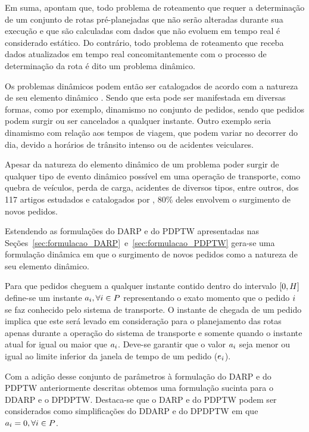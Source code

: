 Em suma, \textcite{psaraftis_dynamic_2015} apontam que, 
todo problema de roteamento que requer a determinação de um conjunto
de rotas pré-planejadas que não serão alteradas durante sua execução e que 
são calculadas com dados que não evoluem em tempo real é considerado estático.
Do contrário, todo problema de roteamento que receba dados atualizados em tempo
real concomitantemente com o processo de determinação da rota é dito um
problema dinâmico. 

Os problemas dinâmicos podem então ser catalogados de acordo com a natureza de
seu elemento dinâmico \cite{psaraftis_dynamic_2015}.
Sendo que esta pode ser manifestada em diversas formas, como por exemplo,
dinamismo no conjunto de pedidos, sendo que pedidos podem surgir ou ser
cancelados a qualquer instante.
Outro exemplo seria dinamismo com relação aos tempos de viagem, que podem
variar no decorrer do dia, devido a horários de trânsito intenso ou de
acidentes veiculares.

Apesar da natureza do elemento dinâmico de um problema poder surgir de qualquer
tipo de evento dinâmico possível em uma operação de transporte, como quebra de
veículos, perda de carga, acidentes de diversos tipos, entre outros, dos 117
artigos estudados e catalogados por  \textcite{psaraftis_dynamic_2015}, 80\%
deles envolvem o surgimento de novos pedidos.

Estendendo as formulações do DARP e do PDPTW apresentadas nas
Seções~\ref{sec:formulacao_DARP}~e~\ref{sec:formulacao_PDPTW} gera-se uma
formulação dinâmica em que o surgimento de novos pedidos como a natureza de 
seu elemento dinâmico.

Para que pedidos cheguem a qualquer instante contido dentro
do intervalo $[0, H]$ define-se um instante 
$a_i, \forall i \in P$ representando 
o exato momento que o pedido $i$ se faz conhecido pelo sistema de 
transporte.
O instante de chegada de um pedido implica que este será levado
em consideração para o planejamento das rotas apenas durante a
operação do sistema de transporte e somente quando o instante atual for
igual ou maior que $a_i$.
Deve-se garantir que o valor $a_i$ seja menor ou igual ao 
limite inferior da janela de tempo de um pedido 
($e_i$).

Com a adição desse conjunto de parâmetros à formulação do DARP e do PDPTW
anteriormente descritas obtemos uma formulação sucinta para o DDARP e o DPDPTW.
Destaca-se que o DARP e do PDPTW podem ser considerados como simplificações do
DDARP e do DPDPTW em que $a_i = 0, \forall i \in
P$.

